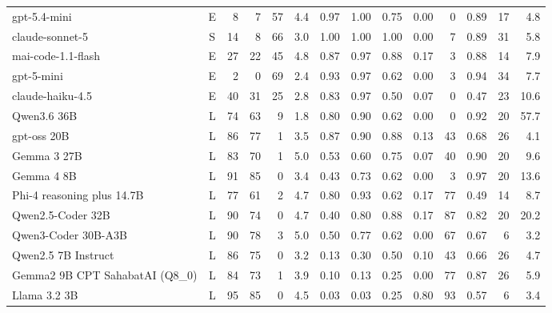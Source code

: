 \begin{table}[t]
\begin{tabular}{@{}l c r r r r r r r r r r r r@{}}
    gpt-5.4-mini & E & 8 & 7 & 57 & 4.4 & 0.97 & 1.00 & 0.75 & 0.00 & 0 & 0.89 & 17 & 4.8 \\
    claude-sonnet-5 & S & 14 & 8 & 66 & 3.0 & 1.00 & 1.00 & 1.00 & 0.00 & 7 & 0.89 & 31 & 5.8 \\
    mai-code-1.1-flash & E & 27 & 22 & 45 & 4.8 & 0.87 & 0.97 & 0.88 & 0.17 & 3 & 0.88 & 14 & 7.9 \\
    gpt-5-mini & E & 2 & 0 & 69 & 2.4 & 0.93 & 0.97 & 0.62 & 0.00 & 3 & 0.94 & 34 & 7.7 \\
    claude-haiku-4.5 & E & 40 & 31 & 25 & 2.8 & 0.83 & 0.97 & 0.50 & 0.07 & 0 & 0.47 & 23 & 10.6 \\
    \midrule
    Qwen3.6 36B & L & 74 & 63 & 9 & 1.8 & 0.80 & 0.90 & 0.62 & 0.00 & 0 & 0.92 & 20 & 57.7 \\
    gpt-oss 20B & L & 86 & 77 & 1 & 3.5 & 0.87 & 0.90 & 0.88 & 0.13 & 43 & 0.68 & 26 & 4.1 \\
    Gemma 3 27B & L & 83 & 70 & 1 & 5.0 & 0.53 & 0.60 & 0.75 & 0.07 & 40 & 0.90 & 20 & 9.6 \\
    Gemma 4 8B & L & 91 & 85 & 0 & 3.4 & 0.43 & 0.73 & 0.62 & 0.00 & 3 & 0.97 & 20 & 13.6 \\
    Phi-4 reasoning plus 14.7B & L & 77 & 61 & 2 & 4.7 & 0.80 & 0.93 & 0.62 & 0.17 & 77 & 0.49 & 14 & 8.7 \\
    Qwen2.5-Coder 32B & L & 90 & 74 & 0 & 4.7 & 0.40 & 0.80 & 0.88 & 0.17 & 87 & 0.82 & 20 & 20.2 \\
    Qwen3-Coder 30B-A3B & L & 90 & 78 & 3 & 5.0 & 0.50 & 0.77 & 0.62 & 0.00 & 67 & 0.67 & 6 & 3.2 \\
    Qwen2.5 7B Instruct & L & 86 & 75 & 0 & 3.2 & 0.13 & 0.30 & 0.50 & 0.10 & 43 & 0.66 & 26 & 4.7 \\
    Gemma2 9B CPT SahabatAI (Q8\_0) & L & 84 & 73 & 1 & 3.9 & 0.10 & 0.13 & 0.25 & 0.00 & 77 & 0.87 & 26 & 5.9 \\
    Llama 3.2 3B & L & 95 & 85 & 0 & 4.5 & 0.03 & 0.03 & 0.25 & 0.80 & 93 & 0.57 & 6 & 3.4 \\
    \bottomrule
  \end{tabular}
\end{table}
